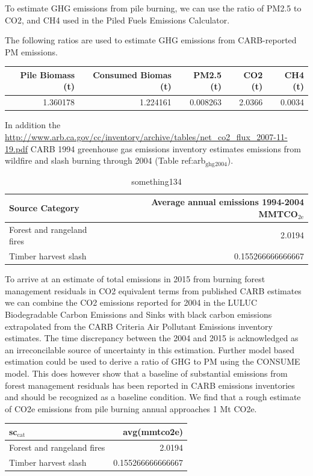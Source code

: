 \documentclass[a4paper]{article}
\begin{document}
To estimate GHG emissions from pile burning, we can use the ratio of
PM2.5 to CO2, and CH4 used in the Piled Fuels Emissions Calculator. 

The following ratios are used to estimate GHG emissions from CARB-reported
PM emissions.

\begin{center}
\begin{tabular}{rrrrr}
Pile Biomass (t) & Consumed Biomas (t) & PM2.5 (t) & CO2 (t) & CH4 (t)\\
\hline
1.360178 & 1.224161 & 0.008263 & 2.0366 & 0.0034\\
\end{tabular}
\end{center}


In addition the
\url{http://www.arb.ca.gov/cc/inventory/archive/tables/net_co2_flux_2007-11-19.pdf}
CARB 1994 greenhouse gas emissions inventory estimates emissions from
wildfire and slash burning through 2004 (Table ref:arb$_{\text{ghg}}$$_{\text{2004}}$).
\begin{table}[htb]
\caption{something134}
\centering
\begin{tabular}{lr}
Source Category & Average annual emissions 1994-2004 MMTCO$_{\text{2e}}$\\
\hline
Forest and rangeland fires & 2.0194\\
Timber harvest slash & 0.155266666666667\\
\end{tabular}
\end{table}


To arrive at an estimate of total emissions in 2015 from burning forest
management residuals in CO2 equivalent terms from published CARB
estimates we can combine the CO2 emissions reported for 2004 in the
LULUC Biodegradable Carbon Emissions and Sinks with black carbon
emissions extrapolated from the CARB Criteria Air Pollutant Emissions
inventory estimates. The time discrepancy between the 2004 and 2015 is
acknowledged as an irreconcilable source of uncertainty in this
estimation. Further model based estimation could be used to derive a
ratio of GHG to PM using the CONSUME model. This does however show that a baseline of
substantial emissions from forest management residuals has been reported
in CARB emissions inventories and should be recognized as a baseline
condition. We find that a rough estimate of CO2e emissions from pile
burning annual approaches 1 Mt CO2e.

\begin{center}
\begin{tabular}{lr}
sc$_{\text{cat}}$ & avg(mmtco2e)\\
\hline
Forest and rangeland fires & 2.0194\\
Timber harvest slash & 0.155266666666667\\
\end{tabular}
\end{center}
\end{document}
